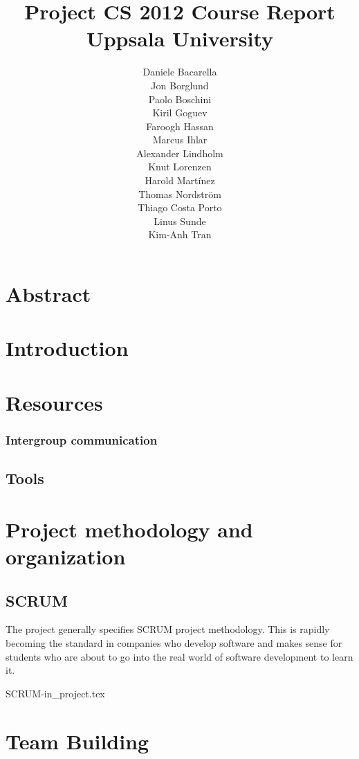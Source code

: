 \documentclass[11pt]{report}
\title{Project CS 2012 Course Report\\Uppsala University\\}
\author{Daniele Bacarella\\
		Jon Borglund\\
		Paolo Boschini\\
		Kiril Goguev\\
		Faroogh Hassan\\
		Marcus Ihlar\\
		Alexander Lindholm\\
		Knut Lorenzen\\
		Harold Mart\'{i}nez\\
		Thomas Nordstr\"om\\
		Thiago Costa Porto\\
		Linus Sunde\\
		Kim-Anh Tran
}
\date{}
\begin{document}
\maketitle

\tableofcontents

\chapter{Abstract}


\chapter{Introduction}

\chapter{Resources}






\subsection{Intergroup communication}

\section{Tools}



\chapter{Project methodology and organization}
\section{SCRUM}

The project generally specifies SCRUM project methodology. This is rapidly becoming the standard in companies who develop software and makes sense for students who are about to go into the real world of software development to learn it.





 {SCRUM-in_project.tex}


\chapter{Team Building}

\end{document}
